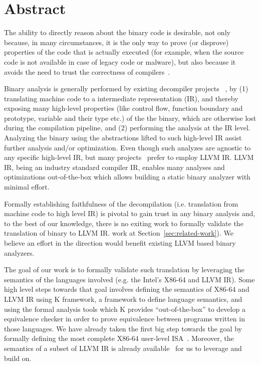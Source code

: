 \section{Abstract}

The ability to directly reason about the binary code is desirable, not only
because, in many circumstances, it is the only way to prove (or disprove)
  properties of the code that is actually executed (for example, when the
      source code is not available in case of legacy code or malware), but also
  because it avoids the need to trust the correctness of
  compilers~\cite{Thompson,WYSINWYE}.

Binary analysis is generally performed by existing decompiler projects
~\cite{McSema:Recon14,Remill,Angr1,BAP:CAV11,Radare2}, by (1) translating
machine code to a intermediate representation (IR), and thereby exposing many
high-level properties (like control flow, function boundary and prototype,
    variable and their type etc.) of the the binary, which are otherwise lost
during the compilation pipeline, and (2) performing the analysis at the IR
level.  Analyzing the binary using the abstractions lifted to such high-level
IR assist further analysis and/or optimization. Even though such analyzes are
agnostic to any specific high-level IR, but many
projects~\cite{McSema:Recon14,Remill,FCD,reopt,llvm-mctoll} prefer to employ
LLVM IR. LLVM IR, being an industry standard compiler IR, enables many analyses
and optimizations out-of-the-box which allows building a static binary analyzer
with minimal effort.

Formally establishing faithfulness of the decompilation (i.e. translation from
    machine code to high level IR) is pivotal to gain trust in any binary
analysis and, to the best of our knowledge, there is no exiting work to
formally validate the translation of binary to LLVM IR.%
    work at Section~\ref{sec:related-work}).  We believe an effort in the
direction would benefit existing LLVM based binary analyzers.

The goal of our work is to formally validate such translation by leveraging the
semantics of the languages involved (e.g. the Intel's X86-64 and LLVM IR). Some
high level steps towards that goal involves defining the semantics of X86-64
and LLVM IR using K framework, a framework to define language semantics, and
using the formal analysis tools which K provides ``out-of-the-box'' to develop
a equivalence checker in order to prove equivalence between programs written in
those languages.  We have already taken the first big step towards the goal by
formally defining the most complete X86-64 user-level
ISA~\cite{DasguptaAdve:PLDI19}. Moreover, the semantics of a subset of LLVM IR
is already available~\cite{LLVMSEMA} for us to leverage and build on.

